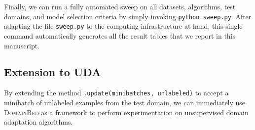 \documentclass{article}
\newcommand{\domainbed}{\textsc{DomainBed}\xspace}
\begin{document}
\scalebox{0.75}{\usebox{\lstd}}

Finally, we can run a fully automated sweep on all datasets, algorithms, test domains, and model selection criteria by simply invoking \texttt{python sweep.py}. After adapting the file \texttt{sweep.py} to the computing infrastructure at hand, this single command automatically generates all the result tables that we report in this manuscript. 

\subsection{Extension to UDA}

By extending the method \texttt{.update(minibatches, unlabeled)} to accept a minibatch of unlabeled examples from the test domain, we can immediately use \domainbed as a framework to perform experimentation on unsupervised domain adaptation algorithms.
\end{document}
